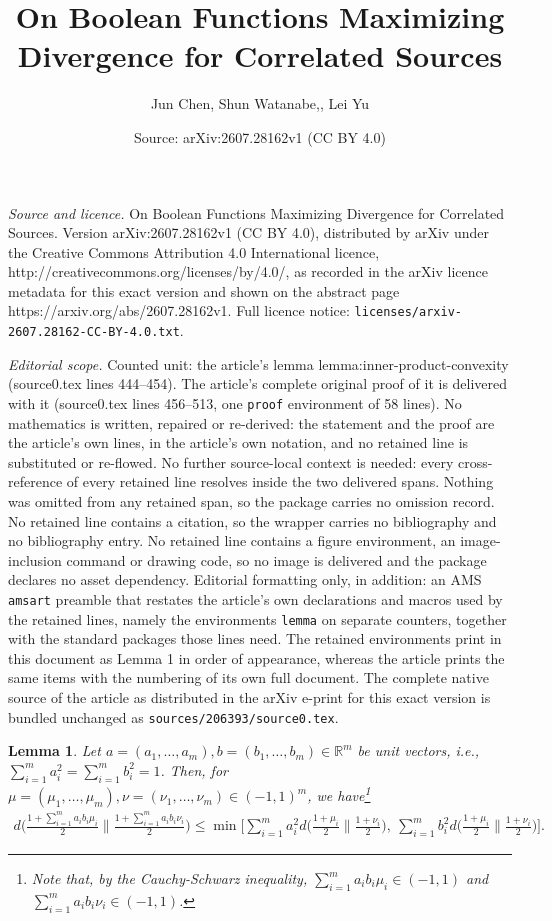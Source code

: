 \documentclass[10pt,a4paper]{amsart}
\title{On Boolean Functions Maximizing Divergence for Correlated Sources}
\author{Jun Chen, Shun Watanabe,, Lei Yu}
\date{Source: arXiv:2607.28162v1 (CC BY 4.0)}
\newtheorem{lemma}{Lemma}
\begin{document}
\maketitle

\noindent\emph{Source and licence.} On Boolean Functions Maximizing Divergence for Correlated Sources. Version arXiv:2607.28162v1 (CC BY 4.0), distributed by arXiv under the Creative Commons Attribution 4.0 International licence, http://creativecommons.org/licenses/by/4.0/, as recorded in the arXiv licence metadata for this exact version and shown on the abstract page https://arxiv.org/abs/2607.28162v1. Full licence notice: \texttt{licenses/arxiv-2607.28162-CC-BY-4.0.txt}.\par\smallskip

\noindent\textit{Editorial scope.} Counted unit: the article's lemma lemma:inner-product-convexity (source0.tex lines 444--454). The article's complete original proof of it is delivered with it (source0.tex lines 456--513, one \texttt{proof} environment of 58 lines). No mathematics is written, repaired or re-derived: the statement and the proof are the article's own lines, in the article's own notation, and no retained line is substituted or re-flowed.  No further source-local context is needed: every cross-reference of every retained line resolves inside the two delivered spans.  Nothing was omitted from any retained span, so the package carries no omission record.  No retained line contains a citation, so the wrapper carries no bibliography and no bibliography entry.  No retained line contains a figure environment, an image-inclusion command or drawing code, so no image is delivered and the package declares no asset dependency.  Editorial formatting only, in addition: an AMS \texttt{amsart} preamble that restates the article's own declarations and macros used by the retained lines, namely the environments \texttt{lemma} on separate counters, together with the standard packages those lines need.  The retained environments print in this document as Lemma 1 in order of appearance, whereas the article prints the same items with the numbering of its own full document.  The complete native source of the article as distributed in the arXiv e-print for this exact version is bundled unchanged as \texttt{sources/206393/source0.tex}.
\begin{lemma} \label{lemma:inner-product-convexity}
Let $a = (a_1,\ldots,a_m), b= (b_1,\ldots,b_m) \in \mathbb{R}^m$ be unit vectors, i.e., $\sum_{i=1}^m a_i^2 =  \sum_{i=1}^m b_i^2  = 1$.
Then, for $\mu = (\mu_1,\ldots,\mu_m), \nu = (\nu_1,\ldots,\nu_m) \in (-1,1)^m$, we have\footnote{Note that, by the Cauchy-Schwarz inequality,
$\sum_{i=1}^m a_i b_i \mu_i \in (-1,1)$ and $\sum_{i=1}^m a_i b_i \nu_i \in (-1,1)$.}
\begin{align}
d\bigg( \frac{1 + \sum_{i=1}^m a_i b_i \mu_i}{2} \bigg\| \frac{1+ \sum_{i=1}^m a_i b_i \nu_i}{2} \bigg) 
\le \min\bigg[
\sum_{i=1}^m a_i^2 d\bigg( \frac{1+\mu_i}{2} \bigg\| \frac{1+\nu_i}{2} \bigg),~\sum_{i=1}^m b_i^2 d\bigg( \frac{1+\mu_i}{2} \bigg\| \frac{1+\nu_i}{2} \bigg)
\bigg].
\end{align}
\end{lemma}
\end{document}
